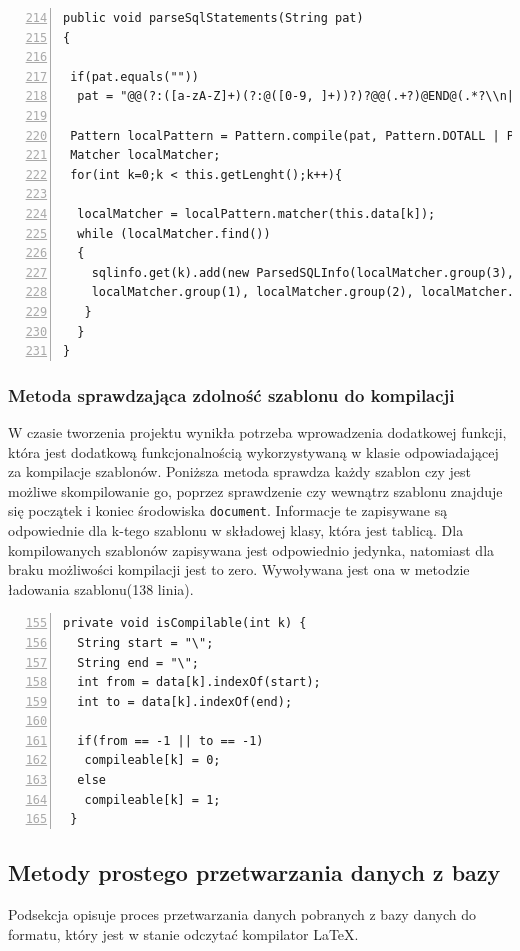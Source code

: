  \begin{lstlisting}[numbers=left,firstnumber=214]
public void parseSqlStatements(String pat)
{

 if(pat.equals(""))
  pat = "@@(?:([a-zA-Z]+)(?:@([0-9, ]+))?)?@@(.+?)@END@(.*?\\n|.*)";
    
 Pattern localPattern = Pattern.compile(pat, Pattern.DOTALL | Pattern.MULTILINE);
 Matcher localMatcher;
 for(int k=0;k < this.getLenght();k++){

  localMatcher = localPattern.matcher(this.data[k]);
  while (localMatcher.find())
  {
    sqlinfo.get(k).add(new ParsedSQLInfo(localMatcher.group(3),
    localMatcher.group(1), localMatcher.group(2), localMatcher.end()));
   }
  }
}
  \end{lstlisting}
   
\subsubsection*{Metoda sprawdzająca zdolność szablonu do kompilacji}

W czasie tworzenia projektu wynikła potrzeba wprowadzenia dodatkowej funkcji, która jest dodatkową funkcjonalnością wykorzystywaną w klasie odpowiadającej za kompilacje szablonów. Poniższa metoda sprawdza każdy szablon czy jest możliwe skompilowanie go, poprzez sprawdzenie czy wewnątrz szablonu znajduje się początek i koniec środowiska \texttt{document}. Informacje te zapisywane są odpowiednie dla k-tego szablonu w składowej klasy, która jest tablicą. Dla kompilowanych szablonów zapisywana jest odpowiednio jedynka, natomiast dla braku możliwości kompilacji jest to zero. Wywoływana jest ona w metodzie ładowania szablonu(138 linia).

 \begin{lstlisting}[numbers=left,firstnumber=155]
 private void isCompilable(int k) {
  String start = "\";
  String end = "\";
  int from = data[k].indexOf(start);
  int to = data[k].indexOf(end);
        
  if(from == -1 || to == -1)
   compileable[k] = 0;
  else
   compileable[k] = 1;
 }
  \end{lstlisting}
  
\subsection{Metody prostego przetwarzania danych z bazy}

Podsekcja opisuje proces przetwarzania danych pobranych z bazy danych do formatu, który jest w stanie odczytać kompilator LaTeX.

